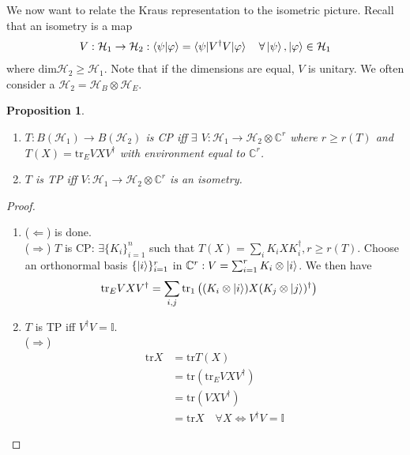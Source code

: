 \documentclass[10pt,oneside,longbibliography]{report}
\newtheorem{proposition}{Proposition}[section]
\begin{document}
We now want to relate the Kraus representation to the isometric picture. Recall that an isometry is a map
\begin{align}
    V: \mathcal{H}_1 \rightarrow \mathcal{H}_2 : \braket{\psi|\varphi} = \braket{\psi|V^{\dagger}V|\varphi} \quad \forall \ket{\psi}, \ket{\varphi} \in \mathcal{H}_1
\end{align}
where $\text{dim} \mathcal{H}_2 \geq \mathcal{H}_1$. Note that if the dimensions are equal, $V$ is unitary. We often consider a $\mathcal{H}_2 = \mathcal{H}_B \otimes \mathcal{H}_E$. 

\begin{proposition}
\begin{enumerate}
    \item $T: B(\mathcal{H}_1)\rightarrow B(\mathcal{H}_2)$  is CP iff $\exists$ $V: \mathcal{H}_1 \rightarrow \mathcal{H}_2 \otimes \mathbb{C}^r$ where $r \geq r(T)$ and $T(X) =\text{tr}_E VXV^{\dagger}$ with environment equal to $\mathbb{C}^r$.
    \item $T$ is TP iff $V: \mathcal{H}_1\rightarrow \mathcal{H}_2 \otimes \mathbb{C}^r$ is an isometry.
\end{enumerate}
\end{proposition}

\begin{tcolorbox}[colframe=black,breakable, colback=black!5, arc=0pt, outer arc=0pt,boxrule=0.5pt]
\begin{proof}
\begin{enumerate}
    \item ($\Leftarrow$) is done. \\
    ($\Rightarrow$) $T$ is CP: $\exists \{K_i\}_{i=1}^n$ such that $T(X) = \sum_i K_i X K_i^{\dagger}, r \geq r(T)$. Choose an orthonormal basis $\{\ket{i}\}_{i=1}^r$ in $\mathbb{C}^r: V=\sum_{i=1}^r K_i \otimes \ket{i}$. We then have 
    \begin{align}
        \text{tr}_E VXV^{\dagger} &= \sum_{i,j}\text{tr}_1 \left((K_i \otimes \ket{i})X(K_j \otimes \ket{j})^{\dagger}\right)
    \end{align}
    
    \item $T$ is TP iff $V^{\dagger}V=\mathbb{I}$. \\
    ($\Rightarrow$) 
    \begin{align}
         \text{tr}X &= \text{tr}T(X) \\
         &= \text{tr}\left(\text{tr}_E VXV^{\dagger}\right) \\
         &= \text{tr}(VXV^{\dagger})\\
         &=\text{tr} X \quad \forall X \Leftrightarrow V^{\dagger}V=\mathbb{I}
    \end{align}
\end{enumerate}
\end{proof}
\end{tcolorbox}
\end{document}
